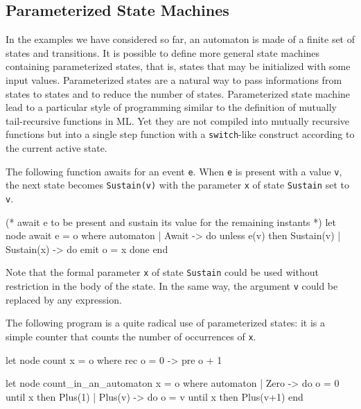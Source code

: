 \documentclass[11pt,titlepage,twoside]{report}
\begin{document}
%

\subsection{Parameterized State Machines}
In the examples we have considered so far, an automaton is made of a
finite set of states and transitions. It is possible to define more
general state machines containing parameterized states, that is,
states that may be initialized with some input values. Parameterized
states are a natural way to pass informations from states to states
and to reduce the number of states. Parameterized state machine
lead to a particular style of programming similar to the
definition of mutually tail-recursive functions in ML. Yet they are not
compiled into mutually recursive functions but into a single step
function with a \texttt{switch}-like construct according to the current
active state.

The following function awaits for an event \texttt{e}. When \texttt{e} is present with
a value \texttt{v}, the next state becomes \texttt{Sustain(v)} with the parameter
\texttt{x} of state \texttt{Sustain} set to \texttt{v}.
\begin{runverbatim}[withresult,label=await]
(* await e to be present and sustain its value for the remaining instants *)
let node await e = o where 
  automaton
  | Await -> do unless e(v) then Sustain(v)
  | Sustain(x) -> do emit o = x done
  end
\end{runverbatim}

Note that the formal parameter \verb-x- of state \verb-Sustain- could
be used without restriction in the body of the state. In the same way, the
argument \verb-v- could be replaced by any expression.

\medskip
The following program is a quite radical use of parameterized states: it
is a simple counter that counts the number of
occurrences of \verb-x-.

\begin{runverbatim}[withresult]
let node count x = o where rec o = 0 -> pre o + 1

let node count_in_an_automaton x = o where
  automaton
  | Zero -> do o = 0 until x then Plus(1)
  | Plus(v) -> do o = v until x then Plus(v+1)
  end
\end{runverbatim}
\end{document}
